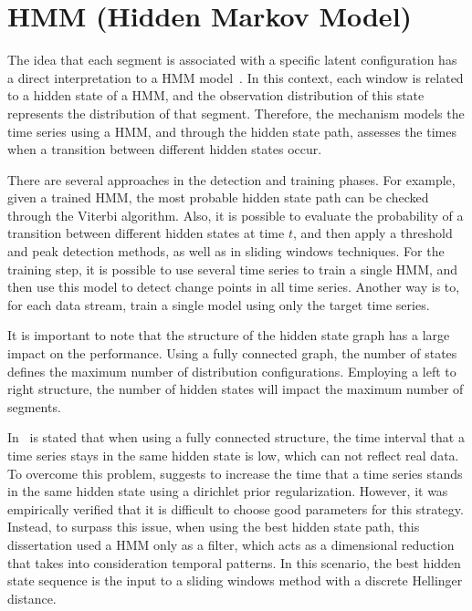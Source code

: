 \section{HMM (Hidden Markov Model)}

The idea that each segment is associated with a specific latent configuration
has a direct interpretation to a HMM
model~\cite{a_hidden_markov_model_segmentation_procedure_for_hydrological_and_environmental_time_series, fast_estimation_of_posterior_probabilities_in_change-point_analysis_through_a_constrained_hidden_markov_model, inertial_hidden_markov_models_modeling_change_in_multivariate_time_series}.
In this context, each window is related to a hidden state of a HMM, and the
observation distribution of this state represents the distribution of that
segment. Therefore, the mechanism models the time series using a HMM, and
through the hidden state path, assesses the times when a transition between
different hidden states occur.

There are several approaches in the detection and training phases. For example,
given a trained HMM, the most probable hidden state path can be checked through
the Viterbi algorithm. Also, it is possible to evaluate the probability of a
transition between different hidden states at time $t$, and then apply a
threshold and peak detection methods, as well as in sliding windows techniques.
For the training step, it is possible to use several time series to train a
single HMM, and then use this model to detect change points in all time series.
Another way is to, for each data stream, train a single model using only the
target time series.

It is important to note that the structure of the hidden state graph has a large
impact on the performance. Using a fully connected graph, the number of states
defines the maximum number of distribution configurations. Employing a left to
right structure, the number of hidden states will impact the maximum number of
segments.

In~\cite{inertial_hidden_markov_models_modeling_change_in_multivariate_time_series}
is stated that when using a fully connected structure, the time interval that a
time series stays in the same hidden state is low, which can not reflect real
data. To overcome this problem,
\cite{inertial_hidden_markov_models_modeling_change_in_multivariate_time_series}
suggests to increase the time that a time series stands in the same hidden
state using a dirichlet prior regularization. However, it was empirically
verified that it is difficult to choose good parameters for this strategy.
Instead, to surpass this issue,
when using the best hidden state path, this dissertation used a HMM only as a
filter, which acts as a dimensional reduction that takes into consideration
temporal
patterns. In this scenario, the best hidden state sequence is the input to
a sliding windows method with a discrete Hellinger distance.

